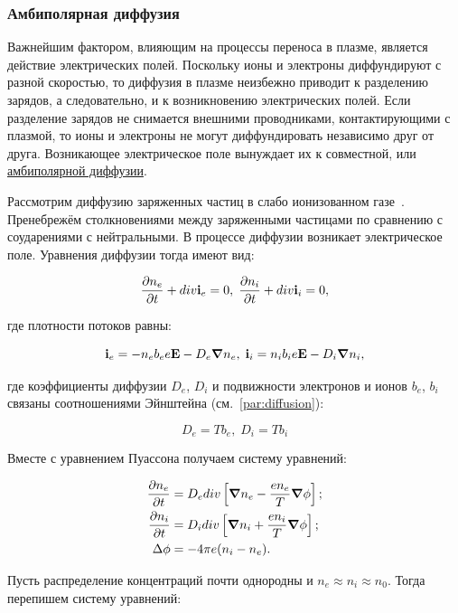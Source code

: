 \documentclass[10pt, a4paper]{article}
\begin{document}
\subsubsection{Амбиполярная диффузия} \label{subsubsec:ambipolar_diffusion}

Важнейшим фактором, влияющим на процессы переноса в плазме, является действие электрических полей. Поскольку ионы и электроны диффундируют с разной скоростью, то диффузия в плазме неизбежно приводит к разделению зарядов, а следовательно, и к возникновению электрических полей. Если разделение зарядов не снимается внешними проводниками, контактирующими с плазмой, то ионы и электроны не могут диффундировать независимо друг от друга. Возникающее электрическое поле вынуждает их к совместной, или \uline{амбиполярной диффузии}.

Рассмотрим диффузию заряженных частиц в слабо ионизованном газе~\cite{landau10}. Пренебрежём столкновениями между заряженными частицами по сравнению с соударениями с нейтральными. В процессе диффузии возникает электрическое поле. Уравнения диффузии тогда имеют вид:

\begin{equation*}
	\pdv{n_e}{t} + div\vb{i}_e = 0,\;\pdv{n_i}{t} + div\vb{i}_i = 0,
\end{equation*}

где плотности потоков равны:

\begin{equation*}
	\vb{i}_e = -n_eb_ee\vb{E}-D_e\grad{n_e},\;\vb{i}_i = n_ib_ie\vb{E}-D_i\grad{n_i},
\end{equation*}

где коэффициенты диффузии $D_e$, $D_i$ и подвижности электронов и ионов $b_e$, $b_i$ связаны соотношениями Эйнштейна (см.~\ref{par:diffusion}):

\begin{equation*}
	D_e = Tb_e,\;D_i = Tb_i
\end{equation*}

Вместе с уравнением Пуассона получаем систему уравнений:

\begin{align*}
	\pdv{n_e}{t} &= D_e div\left[\grad{n_e}-\frac{en_e}{T} \grad{\phi}\right]; \\
	\pdv{n_i}{t} &= D_i div\left[\grad{n_i}+\frac{en_i}{T} \grad{\phi}\right]; \\
	\Delta \phi &= -4\pi e(n_i-n_e).
\end{align*}

Пусть распределение концентраций почти однородны и $n_e\approx n_i\approx n_0$. Тогда перепишем систему уравнений:
\end{document}
